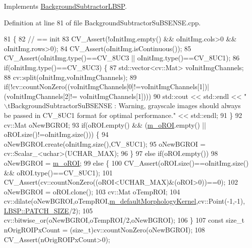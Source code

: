 Implements \mbox{\hyperlink{class_background_subtractor_l_b_s_p_a3644bc10ec3beda6fad22c633fe0f8fb}{Background\+Subtractor\+L\+B\+SP}}.



Definition at line 81 of file Background\+Subtractor\+Su\+B\+S\+E\+N\+S\+E.\+cpp.


\begin{DoxyCode}
81                                                                                       \{
82     \textcolor{comment}{// == init}
83     CV\_Assert(!oInitImg.empty() && oInitImg.cols>0 && oInitImg.rows>0);
84     CV\_Assert(oInitImg.isContinuous());
85     CV\_Assert(oInitImg.type()==CV\_8UC3 || oInitImg.type()==CV\_8UC1);
86     \textcolor{keywordflow}{if}(oInitImg.type()==CV\_8UC3) \{
87         std::vector<cv::Mat> voInitImgChannels;
88         cv::split(oInitImg,voInitImgChannels);
89         \textcolor{keywordflow}{if}(!cv::countNonZero((voInitImgChannels[0]!=voInitImgChannels[1])|(voInitImgChannels[2]!=
      voInitImgChannels[1])))
90             std::cout << std::endl << \textcolor{stringliteral}{"\(\backslash\)tBackgroundSubtractorSuBSENSE : Warning, grayscale images should
       always be passed in CV\_8UC1 format for optimal performance."} << std::endl;
91     \}
92     cv::Mat oNewBGROI;
93     \textcolor{keywordflow}{if}(oROI.empty() && (\mbox{\hyperlink{class_background_subtractor_l_b_s_p_a53fe98bd2489d95de5292467145901e9}{m\_oROI}}.empty() || oROI.size()!=oInitImg.size())) \{
94         oNewBGROI.create(oInitImg.size(),CV\_8UC1);
95         oNewBGROI = cv::Scalar\_<uchar>(UCHAR\_MAX);
96     \}
97     \textcolor{keywordflow}{else} \textcolor{keywordflow}{if}(oROI.empty())
98         oNewBGROI = \mbox{\hyperlink{class_background_subtractor_l_b_s_p_a53fe98bd2489d95de5292467145901e9}{m\_oROI}};
99     \textcolor{keywordflow}{else} \{
100         CV\_Assert(oROI.size()==oInitImg.size() && oROI.type()==CV\_8UC1);
101         CV\_Assert(cv::countNonZero((oROI<UCHAR\_MAX)&(oROI>0))==0);
102         oNewBGROI = oROI.clone();
103         cv::Mat oTempROI;
104         cv::dilate(oNewBGROI,oTempROI,\mbox{\hyperlink{class_background_subtractor_su_b_s_e_n_s_e_ae360b93378aa04b34aebc23b5f6e6714}{m\_defaultMorphologyKernel}},cv::Point(-1,-1),
      \mbox{\hyperlink{class_l_b_s_p_aa98abb79a155d3a2b416c2ab32e74929}{LBSP::PATCH\_SIZE}}/2);
105         cv::bitwise\_or(oNewBGROI,oTempROI/2,oNewBGROI);
106     \}
107     \textcolor{keyword}{const} \textcolor{keywordtype}{size\_t} nOrigROIPxCount = (size\_t)cv::countNonZero(oNewBGROI);
108     CV\_Assert(nOrigROIPxCount>0);

\end{DoxyCode}

